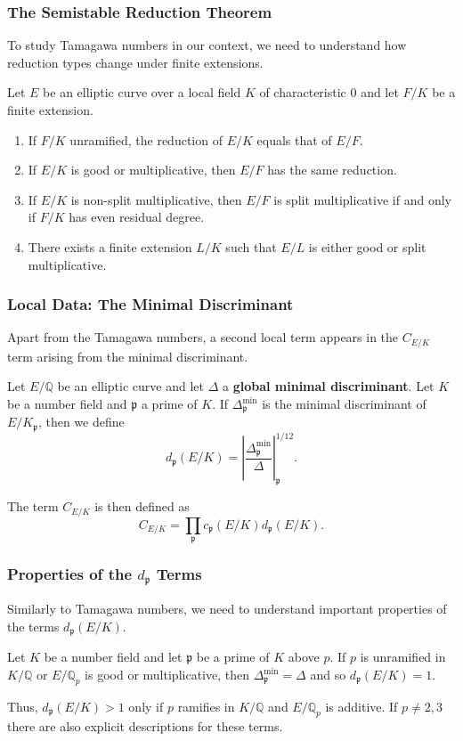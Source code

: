 \documentclass{beamer}
\newcommand{\QQ}{\mathbb{Q}}
\newcommand{\pp}{\mathfrak{p}}
\theoremstyle{plain}
\begin{document}
\begin{frame}
    \frametitle{The Semistable Reduction Theorem}
    To study Tamagawa numbers in our context, we need to understand how reduction types change under finite extensions.
    \begin{lemma}
        Let $E$ be an elliptic curve over a local field $K$ of characteristic $0$ and let $F/K$ be a finite extension. \pause
        \begin{enumerate}
            \item If $F/K$ unramified, the reduction of $E/K$ equals that of $E/F$.\pause
            \item If $E/K$ is good or multiplicative, then $E/F$ has the same reduction.\pause
            \item If $E/K$ is non-split multiplicative, then $E/F$ is split multiplicative if and only if $F/K$ has even residual degree. \pause
            \item There exists a finite extension $L/K$ such that $E/L$ is either good or split multiplicative.
        \end{enumerate}
    \end{lemma}    

\end{frame}

\begin{frame}
    \frametitle{Local Data: The Minimal Discriminant}
    Apart from the Tamagawa numbers, a second local term appears in the $C_{E/K}$ term arising from the minimal discriminant. \pause
    \begin{definition}
        Let $E/\QQ$ be an elliptic curve and let $\Delta$ a \textbf{global minimal discriminant}. \pause Let $K$ be a number field and $\pp$ a prime of $K$. If $\Delta_{\pp}^{\min}$ is the minimal discriminant of $E/K_\pp$, then we define 
        $$d_\pp(E/K)=\left|\frac{\Delta_\pp^{\min}}{\Delta}\right|_\pp^{1/12}.$$
    \end{definition} \pause
    The term $C_{E/K}$ is then defined as 
    $$C_{E/K}=\prod_{\pp}c_\pp(E/K)d_\pp(E/K).$$
\end{frame}

\begin{frame}
    \frametitle{Properties of the $d_\pp$ Terms}
    Similarly to Tamagawa numbers, we need to understand important properties of the terms $d_\pp(E/K)$. \pause
    \begin{lemma}
        Let $K$ be a number field and let $\pp$ be a prime of $K$ above $p$. If $p$ is unramified in $K/\QQ$ or $E/\QQ_p$ is good or multiplicative, then $\Delta_\pp^{\min}=\Delta$ and so $d_\pp(E/K)=1$.
    \end{lemma} \pause
    
    Thus, $d_\pp(E/K)>1$ only if $p$ ramifies in $K/\QQ$ and $E/\QQ_p$ is additive. If $p\neq 2,3$ there are also explicit descriptions for these terms.

\end{frame}
\end{document}
